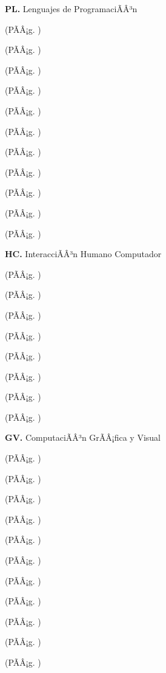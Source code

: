 	\textbf{PL.}  Lenguajes de ProgramaciÃÂ³n%
	\begin{list}{}{%
		\setlength{\labelwidth}{0pt}%
		\setlength{\leftmargin}{15pt}}%
		\item \PLUNODef(PÃÂ¡g. \pageref{sec:BOK-PL1})
		\item \PLDOSDef(PÃÂ¡g. \pageref{sec:BOK-PL2})
		\item \PLTRESDef(PÃÂ¡g. \pageref{sec:BOK-PL3})
		\item \PLCUATRODef(PÃÂ¡g. \pageref{sec:BOK-PL4})
		\item \PLCINCODef(PÃÂ¡g. \pageref{sec:BOK-PL5})
		\item \PLSEISDef(PÃÂ¡g. \pageref{sec:BOK-PL6})
		\item \PLSIETEDef(PÃÂ¡g. \pageref{sec:BOK-PL7})
		\item \PLOCHODef(PÃÂ¡g. \pageref{sec:BOK-PL8})
		\item \PLNUEVEDef(PÃÂ¡g. \pageref{sec:BOK-PL9})
		\item \PLDIEZDef(PÃÂ¡g. \pageref{sec:BOK-PL10})
		\item \PLONCEDef(PÃÂ¡g. \pageref{sec:BOK-PL11})
	\end{list}%
	\textbf{HC.}  InteracciÃÂ³n Humano Computador%
	\begin{list}{}{%
		\setlength{\labelwidth}{0pt}%
		\setlength{\leftmargin}{15pt}}%
		\item \HCUNODef(PÃÂ¡g. \pageref{sec:BOK-HC1})
		\item \HCDOSDef(PÃÂ¡g. \pageref{sec:BOK-HC2})
		\item \HCTRESDef(PÃÂ¡g. \pageref{sec:BOK-HC3})
		\item \HCCUATRODef(PÃÂ¡g. \pageref{sec:BOK-HC4})
		\item \HCCINCODef(PÃÂ¡g. \pageref{sec:BOK-HC5})
		\item \HCSEISDef(PÃÂ¡g. \pageref{sec:BOK-HC6})
		\item \HCSIETEDef(PÃÂ¡g. \pageref{sec:BOK-HC7})
		\item \HCOCHODef(PÃÂ¡g. \pageref{sec:BOK-HC8})
	\end{list}%
	\textbf{GV.}  ComputaciÃÂ³n GrÃÂ¡fica y Visual%
	\begin{list}{}{%
		\setlength{\labelwidth}{0pt}%
		\setlength{\leftmargin}{15pt}}%
		\item \GVUNODef(PÃÂ¡g. \pageref{sec:BOK-GV1})
		\item \GVDOSDef(PÃÂ¡g. \pageref{sec:BOK-GV2})
		\item \GVTRESDef(PÃÂ¡g. \pageref{sec:BOK-GV3})
		\item \GVCUATRODef(PÃÂ¡g. \pageref{sec:BOK-GV4})
		\item \GVCINCODef(PÃÂ¡g. \pageref{sec:BOK-GV5})
		\item \GVSEISDef(PÃÂ¡g. \pageref{sec:BOK-GV6})
		\item \GVSIETEDef(PÃÂ¡g. \pageref{sec:BOK-GV7})
		\item \GVOCHODef(PÃÂ¡g. \pageref{sec:BOK-GV8})
		\item \GVNUEVEDef(PÃÂ¡g. \pageref{sec:BOK-GV9})
		\item \GVDIEZDef(PÃÂ¡g. \pageref{sec:BOK-GV10})
		\item \GVONCEDef(PÃÂ¡g. \pageref{sec:BOK-GV11})
	\end{list}%

